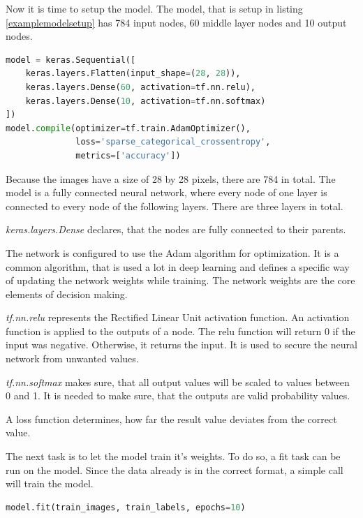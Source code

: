 \documentclass[11pt]{article}
\begin{document}
Now it is time to setup the model.
The model, that is setup in listing \ref{examplemodelsetup} has 784 input nodes, 60 middle layer nodes and 10 output nodes.

\begin{lstlisting}[caption={Setup of the model.}, language=Python, label={examplemodelsetup}]
model = keras.Sequential([
    keras.layers.Flatten(input_shape=(28, 28)),
    keras.layers.Dense(60, activation=tf.nn.relu),
    keras.layers.Dense(10, activation=tf.nn.softmax)
])
model.compile(optimizer=tf.train.AdamOptimizer(),
              loss='sparse_categorical_crossentropy',
              metrics=['accuracy'])
\end{lstlisting}

Because the images have a size of 28 by 28 pixels, there are 784 in total.
The model is a fully connected neural network, where every node of one layer is connected to every node of the following layers.
There are three layers in total.

\textit{keras.layers.Dense} declares, that the nodes are fully connected to their parents.

The network is configured to use the Adam algorithm for optimization.
It is a common algorithm, that is used a lot in deep learning and defines a specific way of updating the network weights while training.
The network weights are the core elements of decision making.

\textit{tf.nn.relu} represents the Rectified Linear Unit activation function.
An activation function is applied to the outputs of a node.
The relu function will return 0 if the input was negative.
Otherwise, it returns the input.
It is used to secure the neural network from unwanted values.

\textit{tf.nn.softmax} makes sure, that all output values will be scaled to values between 0 and 1.
It is needed to make sure, that the outputs are valid probability values.

A loss function determines, how far the result value deviates from the correct value.

The next task is to let the model train it's weights.
To do so, a fit task can be run on the model.
Since the data already is in the correct format, a simple call will train the model.

\begin{lstlisting}[caption={Training the model by using the train value pairs.}, language=Python, label={exampletrain}]
model.fit(train_images, train_labels, epochs=10)
\end{lstlisting}
\end{document}

